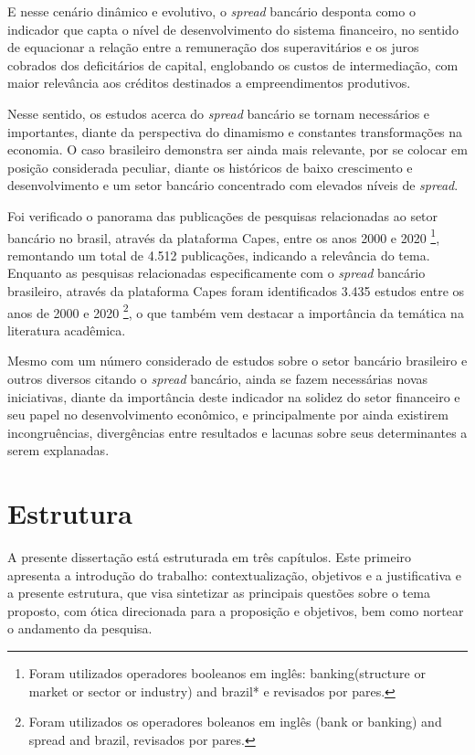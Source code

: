 \documentclass[
  12pt,
  12pt,
  openright,
  oneside,
  a4paper,
  chapter=TITLE,
  section=TITLE,
  subsection=TITLE,
  subsubsection=TITLE,
  portugues,
  sumario=tradicional]{abntex2}
\begin{document}
E nesse cenário dinâmico e evolutivo, o \emph{spread} bancário desponta como o indicador que capta o nível de desenvolvimento do sistema financeiro, no sentido de equacionar a relação entre a remuneração dos superavitários e os juros cobrados dos deficitários de capital, englobando os custos de intermediação, com maior relevância aos créditos destinados a empreendimentos produtivos.

Nesse sentido, os estudos acerca do \emph{spread} bancário se tornam necessários e importantes, diante da perspectiva do dinamismo e constantes transformações na economia. O caso brasileiro demonstra ser ainda mais relevante, por se colocar em posição considerada peculiar, diante os históricos de baixo crescimento e desenvolvimento e um setor bancário concentrado com elevados níveis de \emph{spread}.

Foi verificado o panorama das publicações de pesquisas relacionadas ao setor bancário no brasil, através da plataforma Capes, entre os anos 2000 e 2020
\footnote{Foram utilizados operadores booleanos em inglês: banking(structure or
market or sector or industry) and brazil* e revisados por pares.}, remontando um total de 4.512 publicações, indicando a relevância do tema. Enquanto as pesquisas relacionadas especificamente com o \emph{spread} bancário brasileiro, através da plataforma Capes foram identificados 3.435 estudos entre os anos de 2000 e 2020 \footnote{Foram utilizados os operadores boleanos em
inglês (bank or banking) and spread and brazil, revisados por pares.}, o que também vem destacar a importância da temática na literatura acadêmica.

Mesmo com um número considerado de estudos sobre o setor bancário brasileiro e outros diversos citando o \emph{spread} bancário, ainda se fazem necessárias novas iniciativas, diante da importância deste indicador na solidez do setor financeiro e seu papel no desenvolvimento econômico, e principalmente por ainda existirem incongruências, divergências entre resultados e lacunas sobre seus determinantes a serem explanadas.

\section{Estrutura}

A presente dissertação está estruturada em três capítulos. Este primeiro apresenta a introdução do trabalho: contextualização, objetivos e a justificativa e a presente estrutura, que visa sintetizar as principais questões sobre o tema proposto, com ótica direcionada para a proposição e objetivos, bem como nortear o andamento da pesquisa.
\end{document}

